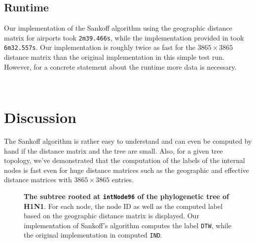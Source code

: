 \documentclass{article}
\begin{document}
\subsection{Runtime}
Our implementation of the Sankoff algorithm using the geographic distance matrix
for airports took \texttt{2m39.466s}, while the implementation provided in
\cite{reimeringPhylogeographicReconstructionUsing2020} took \texttt{6m32.557s}.
Our implementation is roughly twice as fast for the $3865 \times 3865$
distance matrix than the original implementation in this simple test run. 
However, for a concrete statement about the runtime more data is necessary.

\ \\
\section{Discussion}
The Sankoff algorithm is rather easy to understand and can even be computed by
hand if the distance matrix and the tree are small. Also, for a given tree
topology, we've demonstrated that the computation of the labels of the internal
nodes is fast even for huge distance matrices such as the geographic and
effective distance matrices with $3865 \times 3865$ entries.

\begin{figure}[h]
    \centering
    \caption{\textbf{The subtree rooted at \texttt{intNode96} of the
    phylogenetic tree of H1N1}. For each node, the node ID as well as the
    computed label based on the geographic distance matrix is displayed. Our
    implementation of Sankoff's algorithm computes the label \texttt{DTW}, while
    the original implementation in
    \cite{reimeringPhylogeographicReconstructionUsing2020} computed
    \texttt{IND}.}
    \label{fig:subtree}
  \end{figure}
\end{document}
